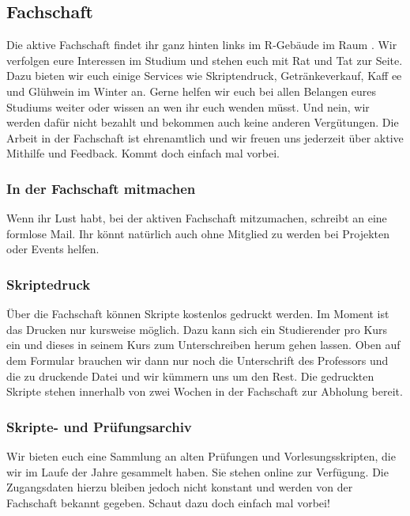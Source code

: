 \subsection{Fachschaft}
Die aktive Fachschaft findet ihr ganz hinten links im R-Gebäude im 
Raum . Wir verfolgen eure Interessen im Studium und stehen 
euch mit Rat und Tat zur Seite. Dazu bieten wir euch einige Services wie 
Skriptendruck, Getränkeverkauf, Kaff ee und Glühwein im Winter an.\doublebreak
Gerne helfen wir euch bei allen Belangen eures 
Studiums weiter oder wissen an wen ihr euch wenden 
müsst. Und nein, wir werden dafür nicht bezahlt 
und bekommen auch keine anderen Vergütungen. 
Die Arbeit in der Fachschaft ist ehrenamtlich und wir 
freuen uns jederzeit über aktive Mithilfe und Feedback. 
Kommt doch einfach mal vorbei. 

\subsubsection{In der Fachschaft mitmachen}
Wenn ihr Lust habt, bei der aktiven Fachschaft mitzumachen, schreibt
an  eine formlose Mail. Ihr könnt
natürlich auch ohne Mitglied zu werden bei Projekten oder Events
helfen.

\subsubsection{Skriptedruck}
Über die Fachschaft können Skripte kostenlos gedruckt werden. 
Im Moment ist das Drucken nur kursweise möglich. Dazu kann sich 
ein Studierender pro Kurs ein   und dieses in seinem Kurs zum Unterschreiben 
herum gehen lassen. Oben auf dem Formular brauchen wir dann nur 
noch die Unterschrift des Professors und die zu druckende Datei und 
wir kümmern uns um den Rest. Die gedruckten Skripte stehen innerhalb von zwei
Wochen in der Fachschaft zur Abholung bereit.

\subsubsection{Skripte- und Prüfungsarchiv}
Wir bieten euch eine Sammlung an alten Prüfungen und Vorlesungsskripten, die wir im Laufe der Jahre gesammelt haben. \doublebreak
Sie stehen online zur Verfügung. Die Zugangsdaten hierzu bleiben jedoch nicht konstant und werden von der Fachschaft bekannt
gegeben. Schaut dazu doch einfach mal vorbei!

